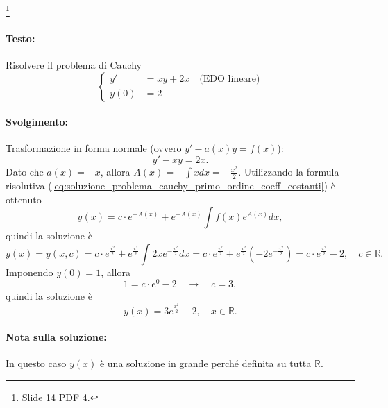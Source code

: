 \begin{example}\footnote{Slide 14 PDF 4.}
    \paragraph{Testo:} Risolvere il problema di Cauchy
    \begin{equation*}
        \begin{cases}
            y' &=xy+2x\quad\text{(EDO lineare)}\\
            y(0)& = 2
        \end{cases}
    \end{equation*}
    \paragraph{Svolgimento:} Trasformazione in forma normale (ovvero $y'-a(x)y=f(x)$):
    \begin{equation*}
        y'-xy = 2x.
    \end{equation*}
    Dato che $a(x)=-x$, allora $A(x)=-\int xdx=-\frac{x^2}{2}$. Utilizzando la formula risolutiva (\ref{eq:soluzione_problema_cauchy_primo_ordine_coeff_costanti}) è ottenuto
    \begin{equation*}
        y(x) = c\cdot e^{-A(x)} + e^{-A(x)}\int f(x) e^{A(x)} dx,
    \end{equation*}
    quindi la soluzione è
    \begin{equation*}
        y(x)=y(x,c)= c\cdot e^{\frac{x^2}{2}}+ e^{\frac{x^2}{2}}\int 2xe^{-\frac{x^2}{2}}dx = c\cdot e^{\frac{x^2}{2}}+ e^{\frac{x^2}{2}}\left(-2 e^{-\frac{x^2}{2}}\right)=c\cdot e^{\frac{x^2}{2}}-2,\quad c\in\mathbb R.
    \end{equation*}
    Imponendo $y(0)=1$, allora
    \begin{equation*}
        1=c\cdot e^{0} -2\quad \rightarrow\quad c = 3,
    \end{equation*}
    quindi la soluzione è
    \begin{equation*}
        y(x) = 3e^{\frac{x^2}{2}}-2,\quad x\in\mathbb R.
    \end{equation*}
    \paragraph{Nota sulla soluzione:} In questo caso $y(x)$ è una soluzione in grande perché definita su tutta $\mathbb R$.
\end{example}


